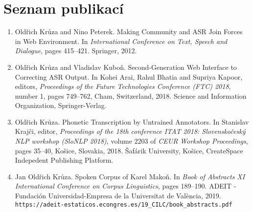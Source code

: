 \chapter*{Seznam publikací}

\begin{enumerate}
\item{
    Oldřich Krůza and Nino Peterek.
    Making Community and ASR Join Forces in Web Environment.
    In \textit{International Conference on Text, Speech and Dialogue},
    pages 415--421.
    Springer, 2012.
}
\item{
    Oldřich Krůza and Vladislav Kuboň.
    Second-Generation Web Interface to Correcting ASR Output.
    In Kohei Arai, Rahul Bhatia and Supriya Kapoor, editors,
    \textit{Proceedings of the Future Technologies Conference (FTC) 2018},
    number 1, pages 749--762, Cham, Switzerland, 2018.
    Science and Information Organization, Springer-Verlag.
}
\item{
    Oldřich Krůza.
    Phonetic Transcription by Untrained Annotators.
    In Stanislav Krajči, editor,
    \textit{Proceedings of the 18th conference ITAT 2018:
    Slovenskočeský NLP workshop (SloNLP 2018)},
    volume 2203 of \textit{CEUR Workshop Proceedings},
    pages 35--40,
    Košice, Slovakia, 2018.
    Šafárik University, Košice,
    CreateSpace Indepedent Publishing Platform.
}
\item{
   Jan Oldřich Krůza.
   Spoken Corpus of Karel Makoň.  
   In \textit{Book of Abstracts XI International Conference on Corpus Linguistics},
   pages 189--190.
   ADEIT - Fundación Universidad-Empresa de la Universitat de València, 2019.\\
   \texttt{https://adeit-estaticos.econgres.es/19\_CILC/book\_abstracts.pdf}
}
\end{enumerate}

